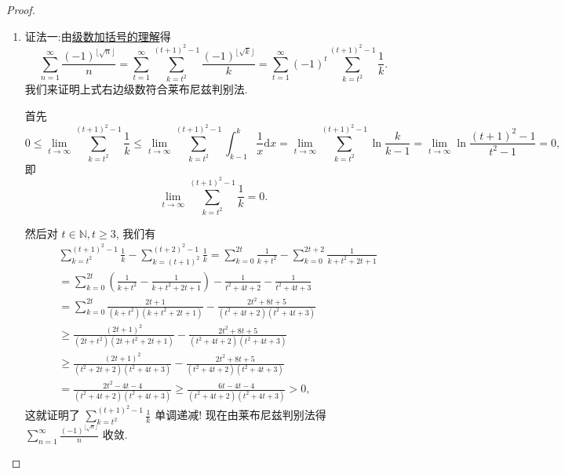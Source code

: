 \documentclass[../../main.tex]{subfiles}%
\begin{document}
\begin{proof}
\begin{enumerate}[(1)]
\item {\color{blue}证法一:}由\hyperref[theorem:级数加括号的理解]{级数加括号的理解}得
\[
\sum_{n=1}^{\infty}{\frac{(-1)^{\lfloor \sqrt{n} \rfloor}}{n}}=\sum_{t=1}^{\infty}{\sum_{k=t^2}^{(t+1)^2-1}{\frac{\left( -1 \right) ^{\lfloor \sqrt{k} \rfloor}}{k}}}=\sum_{t=1}^{\infty}{\left( -1 \right) ^t\sum_{k=t^2}^{(t+1)^2-1}{\frac{1}{k}}}.
\]
我们来证明上式右边级数符合莱布尼兹判别法.

首先
\[
0\leqslant \lim_{t\rightarrow \infty} \sum_{k=t^2}^{(t+1)^2-1}{\frac{1}{k}}\leqslant \lim_{t\rightarrow \infty} \sum_{k=t^2}^{(t+1)^2-1}{\int_{k-1}^k{\frac{1}{x}\mathrm{d}x}}=\lim_{t\rightarrow \infty} \sum_{k=t^2}^{(t+1)^2-1}{\ln \frac{k}{k-1}}=\lim_{t\rightarrow \infty} \ln \frac{(t+1)^2-1}{t^2-1}=0,
\]
即
\[
\lim_{t \to \infty} \sum_{k=t^2}^{(t + 1)^2 - 1} \frac{1}{k} = 0.
\]

然后对 $t \in \mathbb{N}, t \geqslant 3$, 我们有
\begin{align*}
&\sum_{k=t^2}^{(t + 1)^2 - 1} \frac{1}{k} - \sum_{k=(t + 1)^2}^{(t + 2)^2 - 1} \frac{1}{k} = \sum_{k=0}^{2t} \frac{1}{k + t^2} - \sum_{k=0}^{2t + 2} \frac{1}{k + t^2 + 2t + 1} \\
&= \sum_{k=0}^{2t} \left( \frac{1}{k + t^2} - \frac{1}{k + t^2 + 2t + 1} \right) - \frac{1}{t^2 + 4t + 2} - \frac{1}{t^2 + 4t + 3} \\
&= \sum_{k=0}^{2t} \frac{2t + 1}{(k + t^2)(k + t^2 + 2t + 1)} - \frac{2t^2 + 8t + 5}{(t^2 + 4t + 2)(t^2 + 4t + 3)} \\
& \geqslant \frac{(2t + 1)^2}{(2t + t^2)(2t + t^2 + 2t + 1)} - \frac{2t^2 + 8t + 5}{(t^2 + 4t + 2)(t^2 + 4t + 3)} \\
& \geqslant \frac{(2t + 1)^2}{(t^2 + 2t + 2)(t^2 + 4t + 3)} - \frac{2t^2 + 8t + 5}{(t^2 + 4t + 2)(t^2 + 4t + 3)} \\
&= \frac{2t^2 - 4t - 4}{(t^2 + 4t + 2)(t^2 + 4t + 3)} \geqslant \frac{6t - 4t - 4}{(t^2 + 4t + 2)(t^2 + 4t + 3)} > 0,
\end{align*}
这就证明了 $\sum_{k=t^2}^{(t + 1)^2 - 1} \frac{1}{k}$ 单调递减!
现在由莱布尼兹判别法得 $\sum_{n=1}^{\infty} \frac{(-1)^{\lfloor \sqrt{n} \rfloor}}{n}$ 收敛.


\end{enumerate}
\end{proof}
\end{document}
